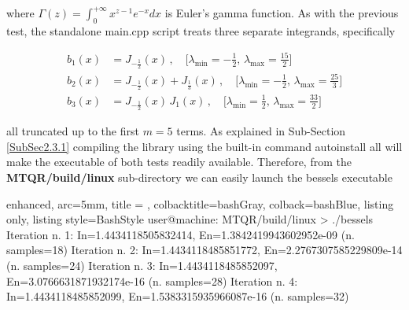 \documentclass[a4paper, twosided]{book}
\begin{document}
\noindent
where $\Gamma(z)=\int_0^{+\infty}x^{z-1}e^{-x}dx$ is Euler's gamma function. As with the previous test, the standalone \colorbox{poliGrayBlue}{main.cpp} script treats three separate integrands, specifically

\begin{equation*}
    \begin{split}
        b_1(x) & = J_{-\frac{1}{2}}(x)\,,\quad\bigg[\lambda_{\text{min}}=-\frac{1}{2},\, \lambda_{\text{max}}=\frac{15}{2}\bigg] \\
        b_2(x) & = J_{-\frac{1}{2}}(x) + J_{\frac{1}{3}}(x)\,,\quad\bigg[\lambda_{\text{min}}=-\frac{1}{2},\, \lambda_{\text{max}}=\frac{25}{3}\bigg] \\
        b_3(x) & = J_{-\frac{1}{2}}(x)\,J_{1}(x)\,,\quad\bigg[\lambda_{\text{min}}=\frac{1}{2},\, \lambda_{\text{max}}=\frac{33}{2}\bigg] 
    \end{split}
\end{equation*}

\noindent
all truncated up to the first $m=5$ terms. As explained in Sub-Section \ref{SubSec2.3.1} compiling the library using the built-in command \colorbox{poliGrayBlue}{autoinstall all} will make the executable of both tests readily available. Therefore, from the \colorbox{poliGrayBlue}{\textbf{MTQR/build/linux}} sub-directory we can easily launch the \colorbox{poliGrayBlue}{bessels} executable

\vspace{0.2cm}
\begin{tcblisting}{enhanced,
                   arc=5mm,
                   title = \color{black}{\large \ttfamily Executing the bessels test case: b\_1(x)},
                   colbacktitle=bashGray,
                   colback=bashBlue,
                   listing only,
                   listing style=BashStyle}
user@machine: MTQR/build/linux > ./bessels 
Iteration n. 1:  In=1.4434118505832414, En=1.3842419943602952e-09   (n. samples=18)
Iteration n. 2:  In=1.4434118485851772, En=2.2767307585229809e-14   (n. samples=24)
Iteration n. 3:  In=1.4434118485852097, En=3.0766631871932174e-16   (n. samples=28)
Iteration n. 4:  In=1.4434118485852099, En=1.5383315935966087e-16   (n. samples=32)

\end{tcblisting}
\vspace{0.3cm}
\end{document}
